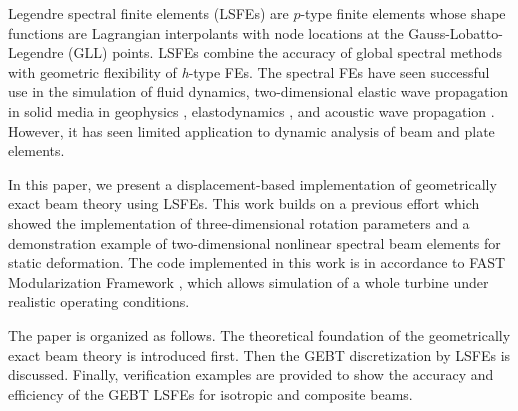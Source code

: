 Legendre spectral finite elements\cite{Patera:1984,Ronquist:1987} (LSFEs) are
$p$-type finite elements whose shape functions are Lagrangian interpolants
with node locations at the Gauss-Lobatto-Legendre (GLL) points. LSFEs combine
the accuracy of global spectral methods with geometric flexibility of {\it
h}-type FEs. The spectral FEs have seen successful use in
the simulation of fluid dynamics\cite{Ronquist:1987, Patera:1984,
Deville:2002}, two-dimensional elastic wave propagation in solid media in
geophysics \cite{Komatitsch:1998}, elastodynamics \cite{Sridhar:2006}, and
acoustic wave propagation \cite{Sprague:2004}. However, it has seen limited
application to dynamic analysis of
beam\cite{Ben-Tal-etal:1995,Ben-Tal-etal:1996,Kudela-etal:2007a,Sprague-Geers:2008,Xiao-Zhong:2012}
and plate elements\cite{Zrahia-Bar-Yoseph:1995,
Kudela-etal:2007b,Sprague-Brito:2012}.   

In this paper, we present a displacement-based implementation of
geometrically exact beam theory using LSFEs.  This work builds on a previous
effort which showed the implementation of three-dimensional rotation
parameters\cite{Wang:GEBT2013} and a demonstration example of
two-dimensional nonlinear spectral beam elements\cite{Wang:SFE2013} for
static deformation.  The code implemented in this work is in accordance to
FAST Modularization Framework \cite{Jonkman:2013},  which allows simulation
of a whole turbine under realistic operating conditions.

The paper is organized as follows.  The theoretical foundation of the
geometrically exact beam theory is introduced first. Then the GEBT
discretization by LSFEs is discussed. Finally, verification examples are
provided to show the accuracy and efficiency of the GEBT LSFEs  for
isotropic  and composite beams.  

